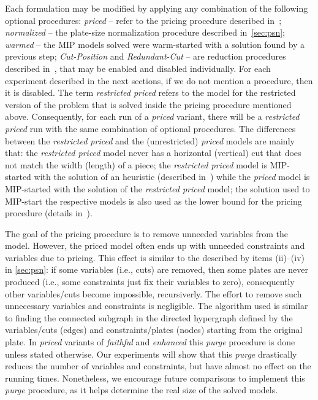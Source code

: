 \documentclass[smallextended]{svjour3}       %
\begin{document}
Each formulation may be modified by applying any combination of the following optional procedures:
\emph{priced} -- refer to the pricing procedure described in~\cite{furini:2016,dimitri_thesis};
\emph{normalized} -- the plate-size normalization procedure described in~\autoref{sec:psn};
\emph{warmed} -- the MIP models solved were warm-started with a solution found by a previous step;
\emph{Cut-Position} and \emph{Redundant-Cut} -- are reduction procedures described in~\cite{furini:2016,dimitri_thesis}, that may be enabled and disabled individually.
For each experiment described in the next sections, if we do not mention a procedure, then it is disabled.
The term \emph{restricted priced} refers to the model for the restricted version of the problem that is solved inside the pricing procedure mentioned above.
Consequently, for each run of a \emph{priced} variant, there will be a \emph{restricted priced} run with the same combination of optional procedures.
The differences between the \emph{restricted priced} and the (unrestricted) \emph{priced} models are mainly that:
the \emph{restricted priced} model never has a horizontal (vertical) cut that does not match the width (length) of a piece;
the \emph{restricted priced} model is MIP-started with the solution of an heuristic (described in~\cite{furini:2016}) while the \emph{priced} model is MIP-started with the solution of the \emph{restricted priced} model;
the solution used to MIP-start the respective models is also used as the lower bound for the pricing procedure (details in~\cite{furini:2016}).

The goal of the pricing procedure is to remove unneeded variables from the model.
However, the priced model often ends up with unneeded constraints and variables due to pricing.
This effect is similar to the described by items (ii)--(iv) in \autoref{sec:psn}: if some variables (i.e., cuts) are removed, then some plates are never produced (i.e., some constraints just fix their variables to zero), consequently other variables/cuts become impossible, recursiverly.
The effort to remove such unnecessary variables and constraints is negligible.
The algorithm used is similar to finding the connected subgraph in the directed hypergraph defined by the variables/cuts (edges) and constraints/plates (nodes) starting from the original plate.
In \emph{priced} variants of \emph{faithful} and \emph{enhanced} this \emph{purge} procedure is done unless stated otherwise.
Our experiments will show that this \emph{purge} drastically reduces the number of variables and constraints, but have almost no effect on the running times.
Nonetheless, we encourage future comparisons to implement this \emph{purge} procedure, as it helps determine the real size of the solved models.
\end{document}
